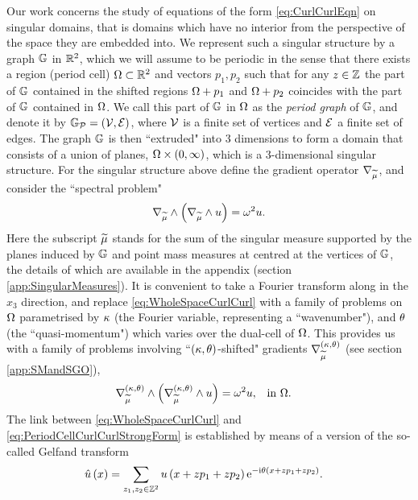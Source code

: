 Our work concerns the study of equations of the form \eqref{eq:CurlCurlEqn} on singular domains, that is domains which have no interior from the perspective of the space they are embedded into.
We represent such a singular structure by a graph $\mathbb{G}$ in $\mathbb{R}^2$, which we will assume to be periodic in the sense that there exists a region (period cell) $\Omega\subset\mathbb{R}^2$ and vectors $p_1, p_2$ such that for any $z\in\mathbb{Z}$ the part of $\mathbb{G}$ contained in the shifted regions $\Omega+p_1$ and $\Omega+p_2$ coincides with the part of $\mathbb{G}$ contained in $\Omega$.
We call this part of $\mathbb{G}$ in $\Omega$ as the \emph{period graph} of $\mathbb{G}$, and denote it by $\mathbb{G}_{\mathcal{P}}=\left( \mathcal{V}, \mathcal{E} \right)$, where $\mathcal{V}$ is a finite set of vertices and $\mathcal{E}$ a finite set of edges.
The graph $\mathbb{G}$ is then ``extruded" into 3 dimensions to form a domain that consists of a union of planes, $\Omega\times\left( 0,\infty \right)$, which is a 3-dimensional singular structure.
For the singular structure above define the gradient operator $\nabla_{\widetilde{\mu}}$, and consider the ``spectral problem"
\begin{align} \label{eq:WholeSpaceCurlCurl}
	\nabla_{\widetilde{\mu}}\wedge \left(  \nabla_{\widetilde{\mu}}\wedge u  \right) = \omega^2 u.
\end{align}
Here the subscript $\widetilde{\mu}$ stands for the sum of the singular measure supported by the planes induced by $\mathbb{G}$ and point mass measures at centred at the vertices of $\mathbb{G}$, the details of which are available in the appendix (section \ref{app:SingularMeasures}).
It is convenient to take a Fourier transform along in the $x_3$ direction, and replace \eqref{eq:WholeSpaceCurlCurl} with a family of problems on $\Omega$ parametrised by $\kappa$ (the Fourier variable, representing a ``wavenumber"), and $\theta$ (the ``quasi-momentum") which varies over the dual-cell of $\Omega$.
This provides us with a family of problems involving ``$\left( \kappa, \theta \right)$-shifted" gradients $\nabla^{\left( \kappa, \theta \right)}_{\widetilde{\mu}}$ (see section \ref{app:SMandSGO}),
\begin{align}  \label{eq:PeriodCellCurlCurlStrongForm}
	\nabla_{\widetilde{\mu}}^{\left( \kappa, \theta \right)}\wedge \left(  \nabla_{\widetilde{\mu}}^{\left( \kappa, \theta \right)}\wedge u  \right) = \omega^2 u, & \quad\text{in } \Omega.
\end{align}
The link between \eqref{eq:WholeSpaceCurlCurl} and \eqref{eq:PeriodCellCurlCurlStrongForm} is established by means of a version of the so-called Gelfand transform \cite{gelfand1950expansion}
\begin{align*}
	\hat{u}\left( x \right) &= \sum_{z_1,z_2\in\mathbb{Z}^2}u\left( x+zp_1+zp_2 \right)\mathrm{e}^{-\mathrm{i}\theta\left( x+zp_1+zp_2 \right)}.
\end{align*}
